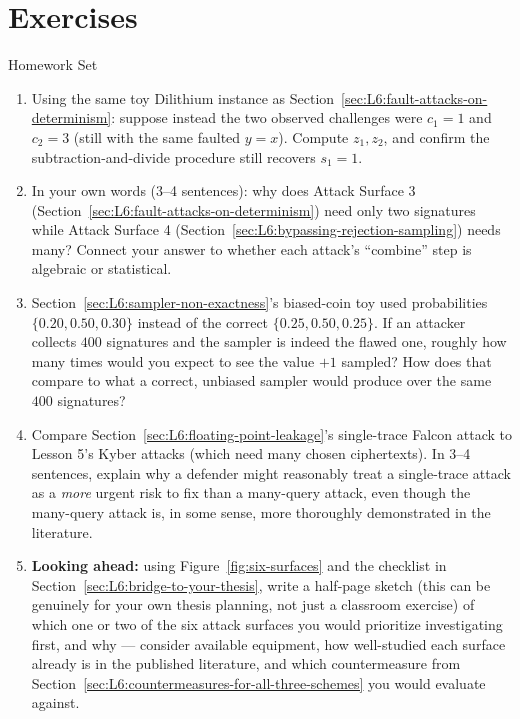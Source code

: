\section{Exercises}
\label{sec:L6:exercises}

\begin{exercisebox}{Homework Set}
\begin{enumerate}[leftmargin=*]
  \item Using the same toy Dilithium instance as Section~\ref{sec:L6:fault-attacks-on-determinism}: suppose instead the two observed challenges were $c_1=1$ and $c_2=3$ (still with the same faulted $y=x$). Compute $z_1,z_2$, and confirm the subtraction-and-divide procedure still recovers $s_1=1$.
  \item In your own words (3--4 sentences): why does Attack Surface 3 (Section~\ref{sec:L6:fault-attacks-on-determinism}) need only two signatures while Attack Surface 4 (Section~\ref{sec:L6:bypassing-rejection-sampling}) needs many? Connect your answer to whether each attack's ``combine'' step is algebraic or statistical.
  \item Section~\ref{sec:L6:sampler-non-exactness}'s biased-coin toy used probabilities $\{0.20,0.50,0.30\}$ instead of the correct $\{0.25,0.50,0.25\}$. If an attacker collects $400$ signatures and the sampler is indeed the flawed one, roughly how many times would you expect to see the value $+1$ sampled? How does that compare to what a correct, unbiased sampler would produce over the same $400$ signatures?
  \item Compare Section~\ref{sec:L6:floating-point-leakage}'s single-trace Falcon attack to Lesson 5's Kyber attacks (which need many chosen ciphertexts). In 3--4 sentences, explain why a defender might reasonably treat a single-trace attack as a \emph{more} urgent risk to fix than a many-query attack, even though the many-query attack is, in some sense, more thoroughly demonstrated in the literature.
  \item \textbf{Looking ahead:} using Figure~\ref{fig:six-surfaces} and the checklist in Section~\ref{sec:L6:bridge-to-your-thesis}, write a half-page sketch (this can be genuinely for your own thesis planning, not just a classroom exercise) of which one or two of the six attack surfaces you would prioritize investigating first, and why --- consider available equipment, how well-studied each surface already is in the published literature, and which countermeasure from Section~\ref{sec:L6:countermeasures-for-all-three-schemes} you would evaluate against.
\end{enumerate}
\end{exercisebox}
